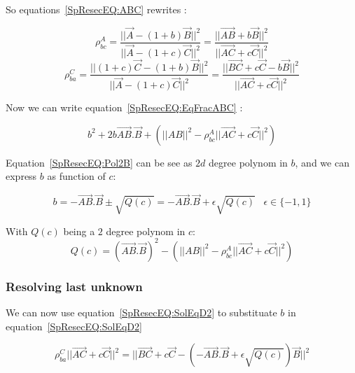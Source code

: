 So equations~\ref{SpResecEQ:ABC} rewrites :

\begin{equation}
	\rho^A_{bc}  
	= \frac{|| \Vec{A} -  (1+b) \Vec{B} ||^2 }{||\Vec{A} - (1+c) \Vec{C}||^2}
	= \frac{|| \overrightarrow{AB} +  b \Vec{B} ||^2 }{||\overrightarrow{AC}  + c \Vec{C}||^2}  \label{SpResecEQ:EqFracABC}
\end{equation}
\begin{equation}
	\rho^C_{ba}  
	= \frac{|| (1+c) \Vec{C} -  (1+b) \Vec{B} ||^2 } {||\Vec{A} -  (1+c) \Vec{C}||^2}
	= \frac{|| \overrightarrow{BC} + c \Vec{C} -  b \Vec{B} ||^2 } {||\overrightarrow{AC}  + c \Vec{C}||^2}
	 \label{SpResecEQ:EqFracCBA}
\end{equation}

Now we can write equation~\ref{SpResecEQ:EqFracABC} :

\begin{equation}
	b^2 + 2 b \overrightarrow{AB}. \Vec{B} + (||AB||^2 -   \rho^A_{bc} ||\overrightarrow{AC}  + c \Vec{C}||^2)
	\label{SpResecEQ:Pol2B}
\end{equation}

Equation~\ref{SpResecEQ:Pol2B} can be see as $2d$ degree polynom in $b$, and we can express $b$ as function of $c$:

\begin{equation}
	b = -\overrightarrow{AB}. \Vec{B} \pm \sqrt{Q(c)}  = -\overrightarrow{AB}. \Vec{B} + \epsilon \sqrt{Q(c)} 
	 \;\;\;  \epsilon \in \{-1,1\}  \label{SpResecEQ:SolEqD2}
\end{equation}

With $Q(c)$ being a $2$ degree polynom in $c$:
\begin{equation}
	Q(c) = (\overrightarrow{AB}. \Vec{B})^2 -  (||AB||^2 -   \rho^A_{bc} ||\overrightarrow{AC}  + c \Vec{C}||^2)
\end{equation}

\subsubsection{Resolving last unknown}

We can now use equation~\ref{SpResecEQ:SolEqD2} to substituate $b$  in equation~\ref{SpResecEQ:SolEqD2}

\begin{equation}
	\rho^C_{ba}   ||\overrightarrow{AC}  + c \Vec{C}||^2
	= || \overrightarrow{BC} + c \Vec{C} -  (-\overrightarrow{AB}. \Vec{B} + \epsilon \sqrt{Q(c)}) \Vec{B} ||^2 
	\label{SpResecEQ:EqcInit}
\end{equation}

